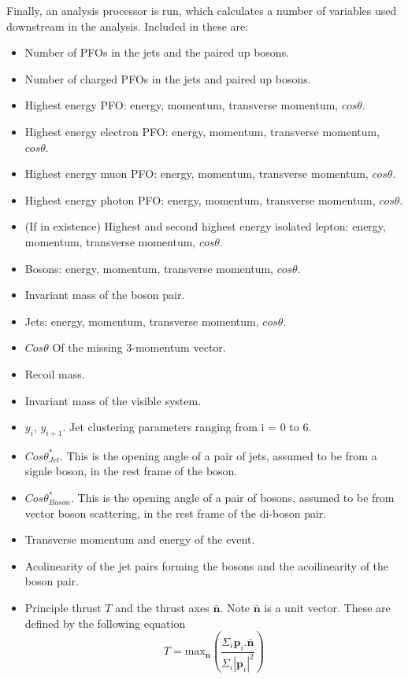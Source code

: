 Finally, an analysis processor is run, which calculates a number of variables used downstream in the analysis. Included in these are:
\begin{itemize}
\item Number of PFOs in the jets and the paired up bosons.
\item Number of charged PFOs in the jets and paired up bosons.
\item Highest energy PFO: energy, momentum, transverse momentum, $cos\theta$.
\item Highest energy electron PFO: energy, momentum, transverse momentum, $cos\theta$.
\item Highest energy muon PFO: energy, momentum, transverse momentum, $cos\theta$.
\item Highest energy photon PFO: energy, momentum, transverse momentum, $cos\theta$.
\item (If in existence) Highest and second highest energy isolated lepton: energy, momentum, transverse momentum, $cos\theta$.
\item Bosons: energy, momentum, transverse momentum, $cos\theta$.
\item Invariant mass of the boson pair.
\item Jets: energy, momentum, transverse momentum, $cos\theta$.
\item $Cos\theta$ Of the missing 3-momentum vector.
\item Recoil mass.
\item Invariant mass of the visible system.
\item $y_{i}$, $y_{i+1}$. Jet clustering parameters ranging from i = 0 to 6.
\item $Cos\theta^{*}_{Jet}$.  This is the opening angle of a pair of jets, assumed to be from a signle boson, in the rest frame of the boson.
\item $Cos\theta^{*}_{Boson}$.  This is the opening angle of a pair of bosons, assumed to be from vector boson scattering, in the rest frame of the di-boson pair.
\item Transverse momentum and energy of the event.
\item Acolinearity of the jet pairs forming the bosons and the acoilinearity of the boson pair.
\item Principle thrust $T$ and the thrust axes $\bar{\textbf{n}}$. Note $\bar{\textbf{n}}$ is a unit vector. These are defined by the following equation
\begin{equation}
T = \text{max}_{\bar{\textbf{n}}} (\frac{\Sigma_{i} \textbf{p}_{i}.\bar{\textbf{n}}}{\Sigma_{i} |\textbf{p}_{i}|^{2}})

\end{equation}
\end{itemize}
